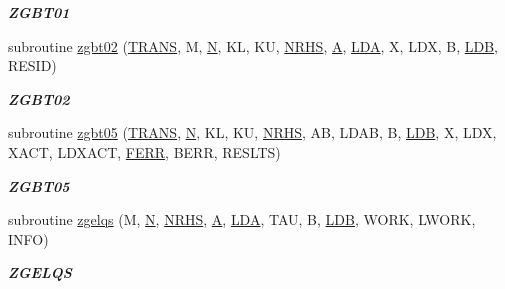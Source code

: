 \begin{DoxyCompactItemize}
\begin{DoxyCompactList}\small\item\em {\bfseries Z\+G\+B\+T01} \end{DoxyCompactList}\item 
subroutine \hyperlink{group__complex16__lin_gae78efd1cb36020f109b1dbe825943c4e}{zgbt02} (\hyperlink{superlu__enum__consts_8h_a0c4e17b2d5cea33f9991ccc6a6678d62a1f61e3015bfe0f0c2c3fda4c5a0cdf58}{T\+R\+A\+N\+S}, M, \hyperlink{polmisc_8c_a0240ac851181b84ac374872dc5434ee4}{N}, K\+L, K\+U, \hyperlink{example__user_8c_aa0138da002ce2a90360df2f521eb3198}{N\+R\+H\+S}, \hyperlink{classA}{A}, \hyperlink{example__user_8c_ae946da542ce0db94dced19b2ecefd1aa}{L\+D\+A}, X, L\+D\+X, B, \hyperlink{example__user_8c_a50e90a7104df172b5a89a06c47fcca04}{L\+D\+B}, R\+E\+S\+I\+D)
\begin{DoxyCompactList}\small\item\em {\bfseries Z\+G\+B\+T02} \end{DoxyCompactList}\item 
subroutine \hyperlink{group__complex16__lin_ga4320e5032c699ad967cec7368d2f680b}{zgbt05} (\hyperlink{superlu__enum__consts_8h_a0c4e17b2d5cea33f9991ccc6a6678d62a1f61e3015bfe0f0c2c3fda4c5a0cdf58}{T\+R\+A\+N\+S}, \hyperlink{polmisc_8c_a0240ac851181b84ac374872dc5434ee4}{N}, K\+L, K\+U, \hyperlink{example__user_8c_aa0138da002ce2a90360df2f521eb3198}{N\+R\+H\+S}, A\+B, L\+D\+A\+B, B, \hyperlink{example__user_8c_a50e90a7104df172b5a89a06c47fcca04}{L\+D\+B}, X, L\+D\+X, X\+A\+C\+T, L\+D\+X\+A\+C\+T, \hyperlink{superlu__enum__consts_8h_af00a42ecad444bbda75cde1b64bd7e72a78fd14d7abebae04095cfbe02928f153}{F\+E\+R\+R}, B\+E\+R\+R, R\+E\+S\+L\+T\+S)
\begin{DoxyCompactList}\small\item\em {\bfseries Z\+G\+B\+T05} \end{DoxyCompactList}\item 
subroutine \hyperlink{group__complex16__lin_ga292b6c44a1408df4fe85df1923008cf6}{zgelqs} (M, \hyperlink{polmisc_8c_a0240ac851181b84ac374872dc5434ee4}{N}, \hyperlink{example__user_8c_aa0138da002ce2a90360df2f521eb3198}{N\+R\+H\+S}, \hyperlink{classA}{A}, \hyperlink{example__user_8c_ae946da542ce0db94dced19b2ecefd1aa}{L\+D\+A}, T\+A\+U, B, \hyperlink{example__user_8c_a50e90a7104df172b5a89a06c47fcca04}{L\+D\+B}, W\+O\+R\+K, L\+W\+O\+R\+K, I\+N\+F\+O)
\begin{DoxyCompactList}\small\item\em {\bfseries Z\+G\+E\+L\+Q\+S} \end{DoxyCompactList}\item 

\end{DoxyCompactItemize}
